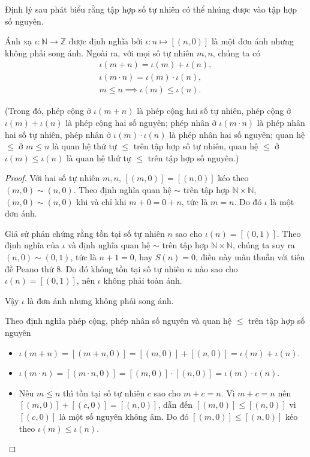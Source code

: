 Định lý sau phát biểu rằng tập hợp số tự nhiên có thể nhúng được vào tập hợp số nguyên.
\begin{theorem}\label{theorem:embed-N-into-Z}
    Ánh xạ $\iota: \mathbb{N}\to \mathbb{Z}$ được định nghĩa bởi $\iota: n\mapsto [(n, 0)]$ là một đơn ánh nhưng không phải song ánh. Ngoài ra, với mọi số tự nhiên $m, n$, chúng ta có
    \[
        \begin{split}
            \iota(m + n) = \iota(m) + \iota(n), \\
            \iota(m\cdot n) = \iota(m)\cdot\iota(n), \\
            m\leq n \implies \iota(m)\leq \iota(n).
        \end{split}
    \]

    (Trong đó, phép cộng ở $\iota(m + n)$ là phép cộng hai số tự nhiên, phép cộng ở $\iota(m) + \iota(n)$ là phép cộng hai số nguyên; phép nhân ở $\iota(m\cdot n)$ là phép nhân hai số tự nhiên, phép nhân ở $\iota(m)\cdot\iota(n)$ là phép nhân hai số nguyên; quan hệ $\leq$ ở $m\leq n$ là quan hệ thứ tự $\leq$ trên tập hợp số tự nhiên, quan hệ $\leq$ ở $\iota(m)\leq \iota(n)$ là quan hệ thứ tự $\leq$ trên tập hợp số nguyên.)
\end{theorem}

\begin{proof}
    Với hai số tự nhiên $m, n$, $[(m, 0)] = [(n, 0)]$ kéo theo $(m, 0)\sim (n, 0)$. Theo định nghĩa quan hệ $\sim$ trên tập hợp $\mathbb{N}\times\mathbb{N}$, $(m, 0)\sim (n, 0)$ khi và chỉ khi $m + 0 = 0 + n$, tức là $m = n$. Do đó $\iota$ là một đơn ánh.

    Giả sử phản chứng rằng tồn tại số tự nhiên $n$ sao cho $\iota(n) = [(0, 1)]$. Theo định nghĩa của $\iota$ và định nghĩa quan hệ $\sim$ trên tập hợp $\mathbb{N}\times\mathbb{N}$, chúng ta suy ra $(n, 0)\sim (0, 1)$, tức là $n + 1 = 0$, hay $S(n) = 0$, điều này mâu thuẫn với tiên đề Peano thứ 8. Do đó không tồn tại số tự nhiên $n$ nào sao cho $\iota(n) = [(0, 1)]$, nên $\iota$ không phải toàn ánh.

    Vậy $\iota$ là đơn ánh nhưng không phải song ánh.

    Theo định nghĩa phép cộng, phép nhân số nguyên và quan hệ $\leq$ trên tập hợp số nguyên
    \begin{itemize}
        \item $\iota(m + n) = [(m + n, 0)] = [(m, 0)] + [(n, 0)] = \iota(m) + \iota(n)$.
        \item $\iota(m\cdot n) = [(m\cdot n, 0)] = [(m, 0)]\cdot [(n, 0)] = \iota(m)\cdot\iota(n)$.
        \item Nếu $m\leq n$ thì tồn tại số tự nhiên $c$ sao cho $m + c = n$. Vì $m + c = n$ nên $[(m, 0)] + [(c, 0)]= [(n, 0)]$, dẫn đến $[(m, 0)]\leq [(n, 0)]$ vì $[(c, 0)]$ là một số nguyên không âm. Do đó $[(m, 0)]\leq [(n, 0)]$ kéo theo $\iota(m)\leq\iota(n)$.
    \end{itemize}
\end{proof}

